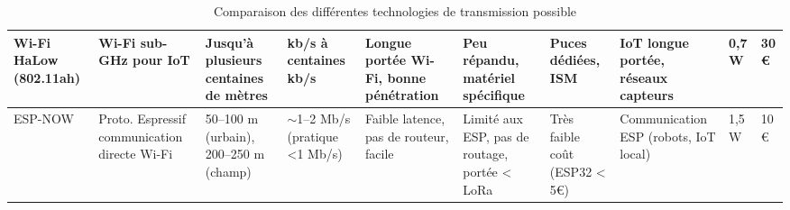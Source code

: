\begin{landscape}
\begin{table}[!ht]
\begin{tabularx}{\textwidth}{|p{2.5cm}|p{3cm}|p{3cm}|p{3cm}|p{2.5cm}|p{3cm}|p{3cm}|p{3.5cm}|p{1.5cm}|p{1.5cm}|}
            \hline
            Wi-Fi HaLow  (802.11ah)           & Wi-Fi sub-GHz  pour IoT                        & Jusqu'à plusieurs  centaines de mètres & kb/s à  centaines kb/s             & Longue portée  Wi-Fi, bonne  pénétration & Peu répandu,  matériel spécifique               & Puces dédiées,  ISM            & IoT longue portée,  réseaux capteurs   & 0,7 W            & 30 €          \\
            \hline
            ESP-NOW                           & Proto. Espressif  communication  directe Wi-Fi & 50–100 m (urbain),  200–250 m (champ)  & $\sim$1–2 Mb/s  (pratique <1 Mb/s) & Faible latence,  pas de routeur,  facile & Limité aux ESP,  pas de routage,  portée < LoRa & Très faible coût  (ESP32 < 5€) & Communication ESP  (robots, IoT local) & 1,5 W            & 10 €          \\
            \hline
        \end{tabularx}
        \caption{Comparaison des différentes technologies de transmission possible} %
    \end{table}

    \vspace*{\fill} %


\end{landscape}
